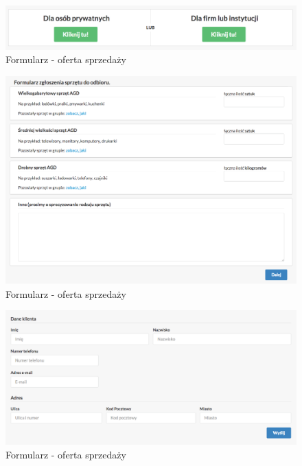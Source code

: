 \documentclass[paper=a4, fontsize=12pt]{scrartcl}
\numberwithin{equation}{section}		%
\numberwithin{figure}{section}			%
\numberwithin{table}{section}				%
\begin{document}
	\begin{figure}[H]
		\centering
		\centerline{\includegraphics[width=1.2\textwidth]{partials/2-wymagania/dokumenty/oferta-choice.png}}
		\caption{Formularz - oferta sprzedaży}
	\end{figure}

	\begin{figure}[H]
		\centering
		\centerline{\includegraphics[width=1.2\textwidth]{partials/2-wymagania/dokumenty/oferta-sprzet.png}}
		\caption{Formularz - oferta sprzedaży}
	\end{figure}

	\begin{figure}[H]
		\centering
		\centerline{\includegraphics[width=1.2\textwidth]{partials/2-wymagania/dokumenty/oferta.png}}
		\caption{Formularz - oferta sprzedaży}
	\end{figure}
\end{document}
